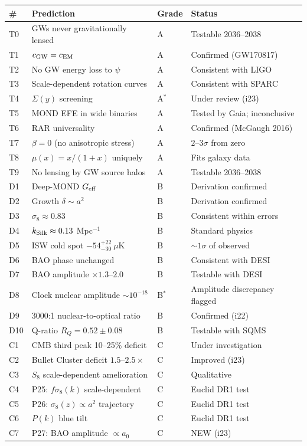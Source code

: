 \documentclass[11pt]{article}
\newcommand{\Geff}{G_{\rm eff}}
\newcommand{\aM}{a_0}
\newcommand{\kSilk}{k_{\rm Silk}}
\begin{document}
\begin{tcolorbox}[colback=blue!5!white, colframe=blue!70!black,
  title=\textbf{W4i23 TOP 5 FINDINGS --- PREDICTIONS TEAM}]
\begin{enumerate}
  \begin{longtable}{p{0.5cm}p{5cm}p{1.5cm}p{4cm}}
  \toprule
  \# & Prediction & Grade & Status \\
  \midrule
  \endhead
  T0 & GWs never gravitationally lensed & A & Testable 2036--2038 \\
  T1 & $c_{\rm GW} = c_{\rm EM}$ & A & Confirmed (GW170817) \\
  T2 & No GW energy loss to $\psi$ & A & Consistent with LIGO \\
  T3 & Scale-dependent rotation curves & A & Consistent with SPARC \\
  T4 & $\Sigma(y)$ screening & A$^*$ & Under review (i23) \\
  T5 & MOND EFE in wide binaries & A & Tested by Gaia; inconclusive \\
  T6 & RAR universality & A & Confirmed (McGaugh 2016) \\
  T7 & $\beta = 0$ (no anisotropic stress) & A & $2$--$3\sigma$ from
    zero \\
  T8 & $\mu(x) = x/(1+x)$ uniquely & A & Fits galaxy data \\
  T9 & No lensing by GW source halos & A & Testable 2036--2038 \\
  \midrule
  D1 & Deep-MOND $\Geff$ & B & Derivation confirmed \\
  D2 & Growth $\delta \sim a^2$ & B & Derivation confirmed \\
  D3 & $\sigma_8 \approx 0.83$ & B & Consistent within errors \\
  D4 & $\kSilk \approx 0.13$ Mpc$^{-1}$ & B & Standard physics \\
  D5 & ISW cold spot $-54^{+22}_{-30}~\mu$K & B & $\sim 1\sigma$
    of observed \\
  D6 & BAO phase unchanged & B & Consistent with DESI \\
  D7 & BAO amplitude $\times 1.3$--$2.0$ & B & Testable with DESI \\
  D8 & Clock nuclear amplitude $\sim 10^{-18}$ & B$^*$ & Amplitude
    discrepancy flagged \\
  D9 & 3000:1 nuclear-to-optical ratio & B & Confirmed (i22) \\
  D10 & Q-ratio $R_Q = 0.52 \pm 0.08$ & B & Testable with SQMS \\
  \midrule
  C1 & CMB third peak 10--25\% deficit & C & Under investigation \\
  C2 & Bullet Cluster deficit $1.5$--$2.5\times$ & C & Improved (i23) \\
  C3 & $S_8$ scale-dependent amelioration & C & Qualitative \\
  C4 & P25: $f\sigma_8(k)$ scale-dependent & C & Euclid DR1 test \\
  C5 & P26: $\sigma_8(z) \propto a^2$ trajectory & C & Euclid DR1 test \\
  C6 & $P(k)$ blue tilt & C & Euclid DR1 test \\
  C7 & P27: BAO amplitude $\propto \aM$ & C & NEW (i23) \\
  \bottomrule
  \end{longtable}


\end{enumerate}
\end{tcolorbox}
\end{document}
